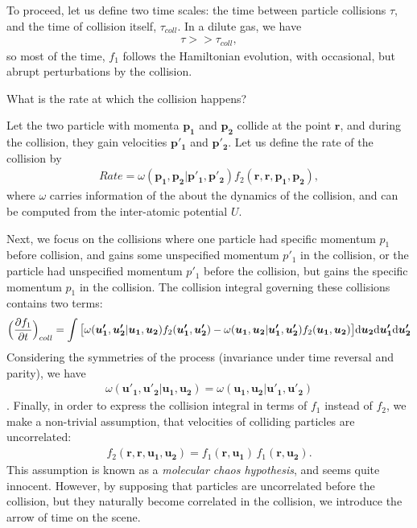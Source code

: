 To proceed, let us define two time scales:
the time between particle collisions $\tau$, and the time of collision itself, $\tau_{coll}$.
In a dilute gas, we have
\begin{align*}
\tau >> \tau_{coll},
\end{align*}
so most of the time, $f_1$ follows the Hamiltonian evolution, with occasional, but abrupt perturbations by the collision. 

What is the rate at which the collision happens?

Let the two particle with momenta $\bm{p_1}$ and $\bm{p_2}$ collide at the point $\bm{r}$, and during the collision, they gain velocities $\bm{p'_1}$ and $\bm{p'_2}$.
Let us define the rate of the collision by
\begin{align*}
Rate = \omega(\bm{p_1},\bm{p_2} | \bm{p'_1}, \bm{p'_2}) f_2(\bm{r},\bm{r},\bm{p_1},\bm{p_2}),
\end{align*}
where $\omega$ carries information of the about the dynamics of the collision, and can be computed from the inter-atomic potential $U$.

Next, we focus on the collisions where one particle had specific momentum $p_1$ before collision, and gains some unspecified momentum $p'_1$ in the collision, or the particle had unspecified momentum $p'_1$ before the collision, but gains the specific momentum $p_1$ in the collision.
The collision integral governing these collisions contains two terms:
\begin{align*}
\Big( \frac{\partial f_1}{\partial t} \Big)_{coll}= \int \big[ \omega(\bm{u'_1},\bm{u'_2} | \bm{u_1}, \bm{u_2}) f_2(\bm{u'_1},\bm{u'_2}) - \omega(\bm{u_1},\bm{u_2} | \bm{u'_1}, \bm{u'_2}) f_2(\bm{u_1}, \bm{u_2}) \big] \mathrm{d} \bm{u_2} \mathrm{d} \bm{u'_1} \mathrm{d} \bm{u'_2}
\end{align*}
Considering the symmetries of the process (invariance under time reversal and parity), we have
\begin{align} \label{symm} 
\omega(\bm{u'_1},\bm{u'_2} | \bm{u_1}, \bm{u_2}) = \omega(\bm{u_1},\bm{u_2} | \bm{u'_1}, \bm{u'_2})
\end{align}.
Finally, in order to express the collision integral in terms of $f_1$ instead of $f_2$, we make a non-trivial assumption, that velocities of colliding particles are uncorrelated:
\begin{align} \label{chaos}
f_2(\bm{r},\bm{r},\bm{u_1},\bm{u_2}) = f_1(\bm{r},\bm{u_1})\,f_1(\bm{r},\bm{u_2}).
\end{align}
This assumption is known as a \textit{molecular chaos hypothesis}, and seems quite innocent. However, by supposing that particles are uncorrelated before the collision, but they naturally become correlated in the collision, we introduce the arrow of time on the scene.

